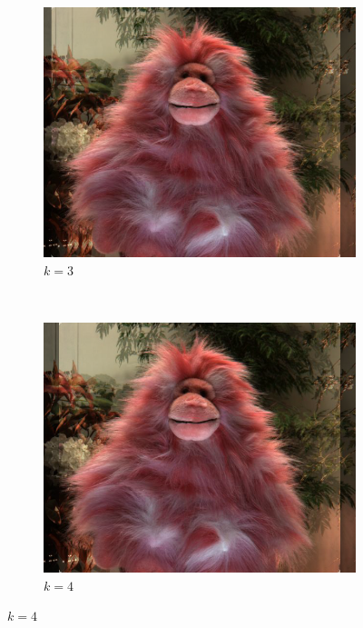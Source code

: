 \documentclass[a4paper]{article}
\begin{document}
\begin{figure}[ht]
	\vspace{2mm}
	\begin{subfigure}[h]{0.48\textwidth}
	  \includegraphics[width=\textwidth]{ShearedInterpolation59_62}
	  \caption*{$k=3$}
	\end{subfigure}
    	~
	\begin{subfigure}[h]{0.48\textwidth}
	  \centering
	  \includegraphics[width=\textwidth]{ShearedInterpolation58_62}
	  \caption*{$k=4$}
	\end{subfigure}
	

\end{figure}
\end{document}
